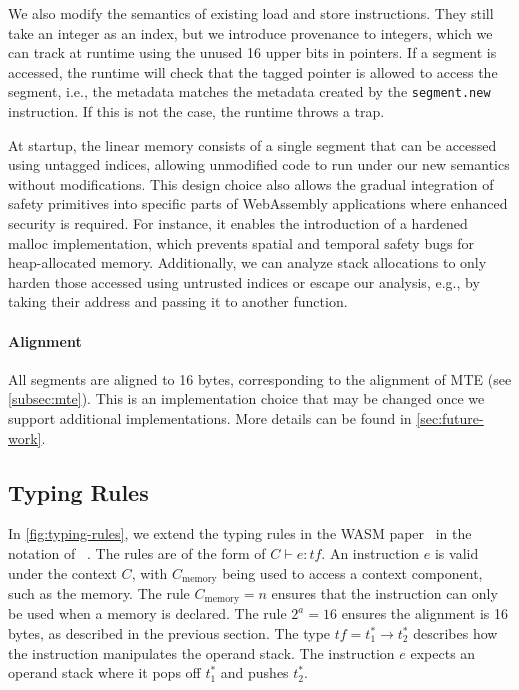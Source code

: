 We also modify the semantics of existing load and store instructions.
They still take an integer as an index, but we introduce provenance to integers, which we can track at runtime using the unused 16 upper bits in pointers.
If a segment is accessed, the runtime will check that the tagged pointer is allowed to access the segment, i.e., the metadata matches the metadata created by the \texttt{segment.new} instruction.
If this is not the case, the runtime throws a trap.

At startup, the linear memory consists of a single segment that can be accessed using untagged indices, allowing unmodified code to run under our new semantics without modifications.
This design choice also allows the gradual integration of safety primitives into specific parts of WebAssembly applications where enhanced security is required.
For instance, it enables the introduction of a hardened malloc implementation, which prevents spatial and temporal safety bugs for heap-allocated memory.
Additionally, we can analyze stack allocations to only harden those accessed using untrusted indices or escape our analysis, e.g., by taking their address and passing it to another function.

\paragraph{Alignment}
All segments are aligned to 16 bytes, corresponding to the alignment of \ac{MTE} (see \cref{subsec:mte}).
This is an implementation choice that may be changed once we support additional implementations.
More details can be found in \cref{sec:future-work}.

\subsection{Typing Rules}
\label{subsec:typing}

In \cref{fig:typing-rules}, we extend the typing rules in the \ac{WASM} paper~\cite{haas2017bringing} in the notation of \citeauthor*{pierce2002types}~\cite{pierce2002types}.
The rules are of the form of $C \vdash e : \mathit{tf}$.
An instruction $e$ is valid under the context $C$, with $C_\text{memory}$ being used to access a context component, such as the memory.
The rule $C_\text{memory} = n$ ensures that the instruction can only be used when a memory is declared.
The rule $2^a=16$ ensures the alignment is 16\,bytes, as described in the previous section.
The type $\mathit{tf} = t_1^* \rightarrow t_2^*$ describes how the instruction manipulates the operand stack.
The instruction $e$ expects an operand stack where it pops off $t_1^*$ and pushes $t_2^*$.

